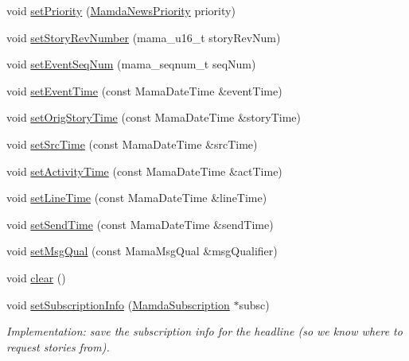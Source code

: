 \begin{CompactItemize}
\item 
void \hyperlink{classWombat_1_1MamdaNewsHeadline_0b2ad6e39331fb6952d6e3ef973fc1cb}{set\-Priority} (\hyperlink{namespaceWombat_faa7709d230f261c8aeb71420f6dd012}{Mamda\-News\-Priority} priority)
\item 
void \hyperlink{classWombat_1_1MamdaNewsHeadline_d7455e7f87ace2006dea7c29d0ca83ea}{set\-Story\-Rev\-Number} (mama\_\-u16\_\-t story\-Rev\-Num)
\item 
void \hyperlink{classWombat_1_1MamdaNewsHeadline_1a77a9c1f31e93b328ededf976e4cb6d}{set\-Event\-Seq\-Num} (mama\_\-seqnum\_\-t seq\-Num)
\item 
void \hyperlink{classWombat_1_1MamdaNewsHeadline_ff354d357230eb98bf105fbe10cecfce}{set\-Event\-Time} (const Mama\-Date\-Time \&event\-Time)
\item 
void \hyperlink{classWombat_1_1MamdaNewsHeadline_cebec0dac4b5b58dd8d537f41275f219}{set\-Orig\-Story\-Time} (const Mama\-Date\-Time \&story\-Time)
\item 
void \hyperlink{classWombat_1_1MamdaNewsHeadline_46fdb313b07b31d6081caacb6c28b4c2}{set\-Src\-Time} (const Mama\-Date\-Time \&src\-Time)
\item 
void \hyperlink{classWombat_1_1MamdaNewsHeadline_2d24225ae9828f208caa7f245ff29ee2}{set\-Activity\-Time} (const Mama\-Date\-Time \&act\-Time)
\item 
void \hyperlink{classWombat_1_1MamdaNewsHeadline_d1ee189e8ff1ef53fd7327fe7f8397d7}{set\-Line\-Time} (const Mama\-Date\-Time \&line\-Time)
\item 
void \hyperlink{classWombat_1_1MamdaNewsHeadline_1be211c11535f625ccef032b47ef0ad4}{set\-Send\-Time} (const Mama\-Date\-Time \&send\-Time)
\item 
void \hyperlink{classWombat_1_1MamdaNewsHeadline_8554790251af05f5d40d31fe21670ecc}{set\-Msg\-Qual} (const Mama\-Msg\-Qual \&msg\-Qualifier)
\item 
void \hyperlink{classWombat_1_1MamdaNewsHeadline_a18c0a1c232820c36523f6da4c8cdcab}{clear} ()
\item 
void \hyperlink{classWombat_1_1MamdaNewsHeadline_2d2ebc17818911fcb02614e4adfa1c66}{set\-Subscription\-Info} (\hyperlink{classWombat_1_1MamdaSubscription}{Mamda\-Subscription} $\ast$subsc)
\begin{CompactList}\small\item\em Implementation: save the subscription info for the headline (so we know where to request stories from). \item\end{CompactList}\item 

\end{CompactItemize}
